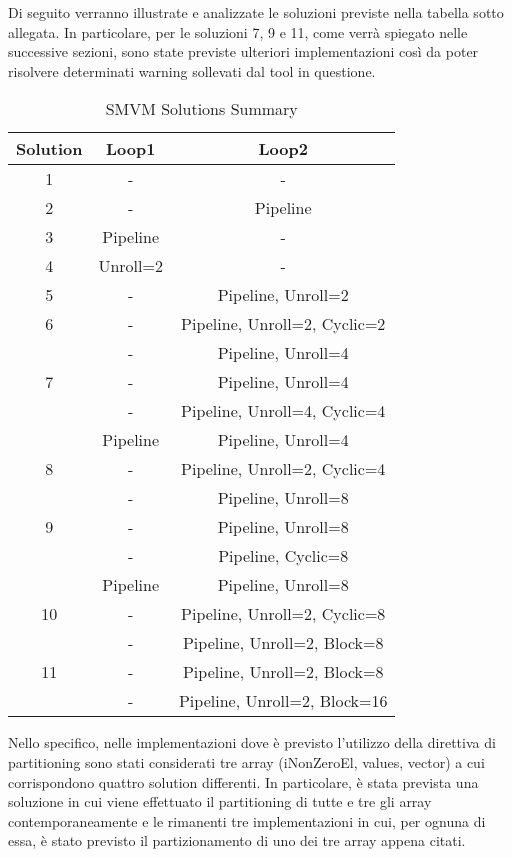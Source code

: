 Di seguito verranno illustrate e analizzate le soluzioni previste nella tabella sotto allegata. In particolare, per le soluzioni 7, 9 e 11, come verrà spiegato nelle successive sezioni, sono state previste ulteriori implementazioni così da poter risolvere determinati warning sollevati dal tool in questione.

\begin{table}[H]
	\centering
	\begin{tabular}{|c|c|c|}
		\hline
		\textbf{Solution} & Loop1 & Loop2 \\
		\hline
		1 & - & - \\
		\hline
		2 & - & Pipeline \\
		\hline
		3 & Pipeline & - \\
		\hline
		4 & Unroll=2 & - \\
		\hline
		5 & - & Pipeline, Unroll=2 \\
		\hline
		6 & - & Pipeline, Unroll=2, Cyclic=2 \\
		\hline
		 & - & Pipeline, Unroll=4 \\
		7 & \footnotesize{-} & \footnotesize{Pipeline, Unroll=4} \\
		 & \footnotesize{-} & \footnotesize{Pipeline, Unroll=4, Cyclic=4} \\
		 & \footnotesize{Pipeline} & \footnotesize{Pipeline, Unroll=4} \\
		\hline
		8 & - & Pipeline, Unroll=2, Cyclic=4 \\
		\hline
		 & - & Pipeline, Unroll=8 \\
		9 & \footnotesize{-} & \footnotesize{Pipeline, Unroll=8} \\
		 & \footnotesize{-} & \footnotesize{Pipeline, Cyclic=8} \\
		 & \footnotesize{Pipeline} & \footnotesize{Pipeline, Unroll=8} \\
		\hline
		10 & - & Pipeline, Unroll=2, Cyclic=8 \\
		\hline
		 & - & Pipeline, Unroll=2, Block=8 \\
		11 & \footnotesize{-} & \footnotesize{Pipeline, Unroll=2, Block=8} \\
		 & \footnotesize{-} & \footnotesize{Pipeline, Unroll=2, Block=16} \\
		\hline
	\end{tabular}
	\caption{SMVM Solutions Summary}
	\label{tab:smvm-solutions-summary}
\end{table}

Nello specifico, nelle implementazioni dove è previsto l'utilizzo della direttiva di partitioning sono stati considerati tre array (iNonZeroEl, values, vector) a cui corrispondono quattro solution differenti. In particolare, è stata prevista una soluzione in cui viene effettuato il partitioning di tutte e tre gli array contemporaneamente e le rimanenti tre implementazioni in cui, per ognuna di essa, è stato previsto il partizionamento di uno dei tre array appena citati.

